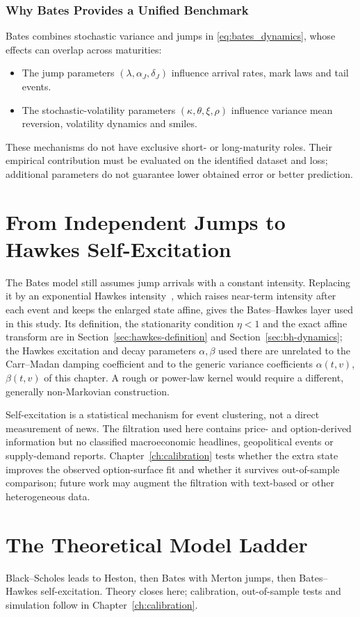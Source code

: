 \subsubsection{Why Bates Provides a Unified Benchmark}

Bates combines stochastic variance and jumps in
\eqref{eq:bates_dynamics}, whose effects can overlap across maturities:
\begin{itemize}[label = --]
    \item The jump parameters $(\lambda,\alpha_J,\delta_J)$ influence
    arrival rates, mark laws and tail events.
    \item The stochastic-volatility parameters $(\kappa,\theta,\xi,\rho)$
    influence variance mean reversion, volatility dynamics and smiles.
\end{itemize}
These mechanisms do not have exclusive short- or long-maturity roles.
Their empirical contribution must be evaluated on the identified dataset
and loss; additional parameters do not guarantee lower obtained error
or better prediction.





\section{From Independent Jumps to Hawkes Self-Excitation}

The Bates model still assumes jump arrivals with a constant intensity. Replacing
it by an exponential Hawkes intensity~\cite{Hawkes1971}, which raises near-term
intensity after each event and keeps the enlarged state affine, gives the
Bates--Hawkes layer used in this study. Its definition, the stationarity
condition $\eta<1$ and the exact affine transform are in
Section~\ref{sec:hawkes-definition} and Section~\ref{sec:bh-dynamics}; the Hawkes
excitation and decay parameters $\alpha,\beta$ used there are unrelated to the
Carr--Madan damping coefficient and to the generic variance coefficients
$\alpha(t,v)$, $\beta(t,v)$ of this chapter. A rough or power-law kernel would
require a different, generally non-Markovian construction.

Self-excitation is a statistical mechanism for event clustering, not a direct
measurement of news. The filtration used here contains price- and
option-derived information but no classified macroeconomic headlines,
geopolitical events or supply-demand reports. Chapter~\ref{ch:calibration} tests whether the extra
state improves the observed option-surface fit and whether it survives
out-of-sample comparison; future work may augment the filtration with
text-based or other heterogeneous data.

\section{The Theoretical Model Ladder}

Black--Scholes leads to Heston, then Bates with Merton jumps, then
Bates--Hawkes self-excitation. Theory closes here; calibration, out-of-sample
tests and simulation follow in Chapter~\ref{ch:calibration}.
